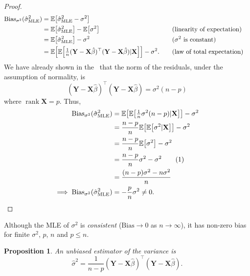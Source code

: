 \documentclass[letterpaper, reqno]{amsart}
\newtheorem{prop}{Proposition}[section]
\numberwithin{equation}{section}
\newcommand{\numberthis}{\addtocounter{equation}{1}\tag{\theequation}}
\newcommand{\T}{\top} %
\newcommand{\vect}[1]{\boldsymbol{\mathbf{#1}}} %
\newcommand{\E}[1]{\mathbb{E}\mleft[#1\mright]}
\newcommand{\by}[1]{&\quad&\text{(#1)}}
\newcommand{\Xm}{\vect{X}}
\newcommand{\Yv}{\vect{Y}}
\newcommand{\Bvh}{\hat{\beta}}
\DeclareMathOperator{\rank}{rank}
\begin{document}
\begin{proof}
  \begin{alignat*}{3}
    \mathrm{Bias}_{\sigma^2}(\hat{\sigma}_\mathrm{MLE}^2) &= \E{\hat{\sigma}_\mathrm{MLE}^2 - \sigma^2} \\
    &= \E{\hat{\sigma}_\mathrm{MLE}^2} - \E{\sigma^2} \by{linearity of expectation} \\
    &= \E{\hat{\sigma}_\mathrm{MLE}^2} - \sigma^2 \by{$\sigma^2$ is constant} \\
    &= \E{\E{\tfrac{1}{n}(\Yv - \Xm\Bvh)^\T(\Yv - \Xm\Bvh) | \Xm}} - \sigma^2. \by{law of total expectation}
  \end{alignat*}
  We have already shown in the~ that the norm of
  the residuals, under the assumption of normality, is 
  \[ (\Yv - \Xm\Bvh)^\T(\Yv - \Xm\Bvh) = \sigma^2 (n - p) \]
  where $\rank \Xm = p$. Thus,
  \begin{align*}
    \mathrm{Bias}_{\sigma^2}(\hat{\sigma}_\mathrm{MLE}^2) &= \E{\E{\tfrac{1}{n}
        \sigma^2 (n - p) | \Xm}} - \sigma^2 \\
    &= \frac{n-p}{n} \E{\E{\sigma^2 | \Xm}} - \sigma^2 \\
    &= \frac{n-p}{n} \E{\sigma^2} - \sigma^2 \\
    &= \frac{n-p}{n} \sigma^2 - \sigma^2 \numberthis \label{eq:Es2} \\
    &= \frac{(n-p)\sigma^2 - n\sigma^2}{n} \\
    \implies \mathrm{Bias}_{\sigma^2}(\hat{\sigma}_\mathrm{MLE}^2) &= -\frac{p}{n} \sigma^2 \ne 0. \qedhere
  \end{align*}
\end{proof}
Although the MLE of $\sigma^2$ is \emph{consistent} ($\mathrm{Bias} \to 0$ as $n
\to \infty$), it has non-zero bias for finite $\sigma^2$, $p$, $n$ and $p \le n$.

\begin{prop}
  An unbiased estimator of the variance is
  \[ \hat{\sigma}^2 = \frac{1}{n-p} (\Yv - \Xm\Bvh)^\T(\Yv - \Xm\Bvh). \]
\end{prop}
\end{document}
